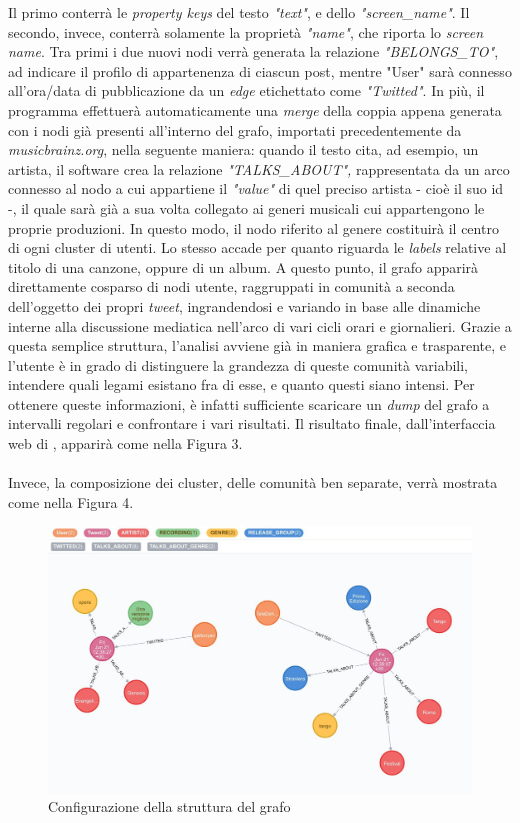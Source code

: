 \documentclass[12pt, a4paper, twocolumn]{article} %
\begin{document}
Il primo conterrà le \textit{property keys} del testo \textit{"text"}, e dello \textit{"screen\_name"}. 
Il secondo, invece, conterrà solamente la proprietà \textit{"name"}, che riporta lo \textit{screen name}. 
Tra primi i due nuovi nodi verrà generata la relazione \textit{"BELONGS\_TO"}, ad indicare il profilo di appartenenza di ciascun post, mentre "User" sarà connesso all'ora/data di pubblicazione da un \textit{edge} etichettato come \textit{"Twitted"}.
In più, il programma effettuerà automaticamente una \textit{merge} della coppia appena generata con i nodi già presenti all'interno del grafo, importati precedentemente da \textit{musicbrainz.org}, nella seguente maniera: quando il testo cita, ad esempio, un artista, il software crea la relazione \textit{"TALKS\_ABOUT",} rappresentata da un arco connesso al nodo a cui appartiene il \textit{"value"} di quel preciso artista - cioè il suo id -, il quale sarà già a sua volta collegato ai generi musicali cui appartengono le proprie produzioni. In questo modo, il nodo riferito al genere costituirà il centro di ogni cluster di utenti. 
Lo stesso accade per quanto riguarda le \textit{labels} relative al titolo di una canzone, oppure di un album. 
A questo punto, il grafo apparirà direttamente cosparso di nodi utente, raggruppati in comunità a seconda dell'oggetto dei propri \textit{tweet}, ingrandendosi e variando in base alle dinamiche interne alla discussione mediatica nell'arco di vari cicli orari e giornalieri. 
Grazie a questa semplice struttura, l'analisi avviene già in maniera grafica e trasparente, e l'utente è in grado di distinguere la grandezza di queste comunità variabili, intendere quali legami esistano fra di esse, e quanto questi siano intensi.
Per ottenere queste informazioni, è infatti sufficiente scaricare un \textit{dump} del grafo a intervalli regolari e confrontare i vari risultati. 
Il risultato finale, dall'interfaccia web di , apparirà come nella Figura 3. \\
\\
Invece, la composizione dei cluster, delle comunità ben separate, verrà mostrata come nella Figura 4.

\begin{figure}
	\centering
	\includegraphics{small_graph.png}
	\caption{Configurazione della struttura del grafo}
\end{figure}
\end{document}
